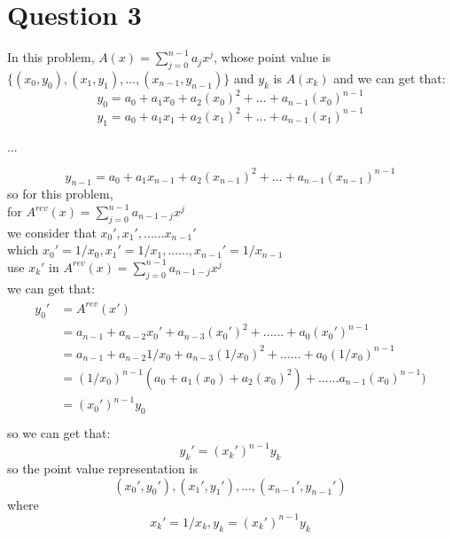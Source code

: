 \documentclass[paper=a4, fontsize=11pt]{scrartcl} %
\numberwithin{equation}{section} %
\numberwithin{figure}{section} %
\numberwithin{table}{section} %
\begin{document}
\section{Question 3}
In this problem, $A(x)=\sum_{j=0}^{n-1} a_jx^j$, whose point value is $\{(x_0, y_0), (x_1, y_1), ... , (x_{n-1},y_{n - 1})\}$ and $y_k$ is $A(x_k)$ and we can get that:
$$ y_0 = a_0 + a_1x_0 + a_2(x_0)^2 + ... + a_{n - 1}(x_0)^{n - 1}$$
$$ y_1 = a_0 + a_1x_1 + a_2(x_1)^2 + ... + a_{n - 1}(x_1)^{n - 1}$$
\centerline{ ... }
$$ y_{n - 1} = a_0 + a_1x_{n - 1} + a_2(x_{n - 1})^2 + ... + a_{n - 1}(x_{n - 1})^{n - 1}$$
so for this problem,\\
for $A^{rev}(x) = \sum_{j = 0}^{n - 1}a_{n - 1 - j}x^j$\\
we consider that $ {x_0'},{x_1'},......x_{n-1}'$\\
which ${x_0'} = 1/x_0, {x_1'} = 1/x_1,......,{x_{n - 1}'} = 1/x_{n - 1}$\\
use $x_k'$ in $A^{rev}(x) = \sum_{j = 0}^{n - 1}a_{n - 1 - j}x^j$\\
we can get that:\\
\begin{align*}
\begin{split}
y_0'&=A^{rev}(x') \\
&=a_{n-1} + a_{n-2}x_0' + a_{n-3}(x_0')^2 + ...... + a_0(x_0')^{n - 1}\\
&=a_{n-1} + a_{n-2}{1/x_0}+a_{n-3}(1/x_0)^2+......+a_0(1/x_0)^{n-1}\\
&=(1/x_0)^{n-1}(a_0+a_1(x_0)+a_2(x_0)^2)+......a_{n-1}(x_0)^{n-1})\\
&=(x_0')^{n-1}y_0\\
\end{split}
\end{align*}
so we can get that:\\
$$y_k'=(x_k')^{n-1}y_k$$
so the point value representation is $$ {(x_0',y_0'),(x_1',y_1'),...,(x_{n-1}',y_{n-1}')}$$
where$$x_k'=1/x_k, y_k=(x_k')^{n-1}y_k $$



\vspace{2cm}
\end{document}
